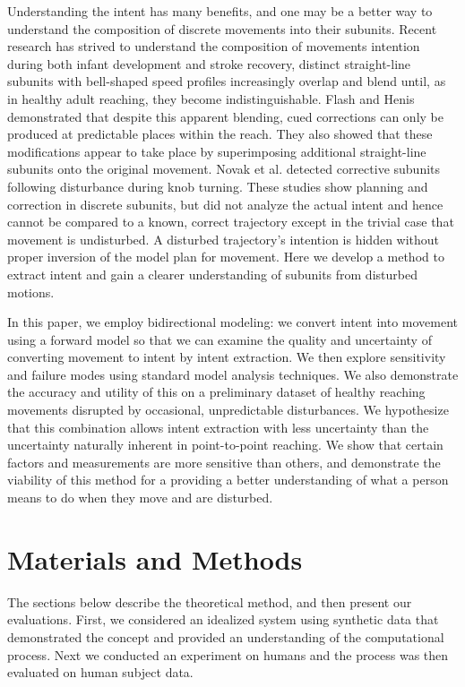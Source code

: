\documentclass[10pt]{article}
\begin{document}
Understanding the intent has many benefits, and one may be a better way to understand the composition of discrete movements into their subunits. Recent research has strived to understand the composition of movements intention during both infant development\cite{von1979observations} and stroke recovery\cite{rohrer2004submovements}, distinct straight-line subunits with bell-shaped speed profiles increasingly overlap and blend until, as in healthy adult reaching\cite{woodworth1899accuracy}, they become indistinguishable. Flash and Henis \cite{flash1991arm} demonstrated that despite this apparent blending, cued corrections can only be produced at predictable places within the reach. They also showed that these modifications appear to take place by superimposing additional straight-line subunits onto the original movement. Novak et al. \cite{novak2002use} detected corrective subunits following disturbance during knob turning. These studies show planning and correction in discrete subunits, but did not analyze the actual intent and hence cannot be compared to a known, correct trajectory except in the trivial case that movement is undisturbed. A disturbed trajectory’s intention is hidden without proper inversion of the model plan for movement. Here we develop a method to extract intent and gain a clearer understanding of subunits from disturbed motions.

In this paper, we employ bidirectional modeling: we convert intent into movement using a forward model so that we can examine the quality and uncertainty of converting movement to intent by intent extraction. We then explore sensitivity and failure modes using standard model analysis techniques. We also demonstrate the accuracy and utility of this on a preliminary dataset of healthy reaching movements disrupted by occasional, unpredictable disturbances. We hypothesize that this combination allows intent extraction with less uncertainty than the uncertainty naturally inherent in point-to-point reaching. We show that certain factors and measurements are more sensitive than others, and demonstrate the viability of this method for a providing a better understanding of what a person means to do when they move and are disturbed.


\section*{Materials and Methods}
The sections below describe the theoretical method, and then present our evaluations. First, we considered an idealized system using synthetic data that demonstrated the concept and provided an understanding of the computational process. Next we conducted an experiment on humans and the process was then evaluated on human subject data. 
\end{document}
